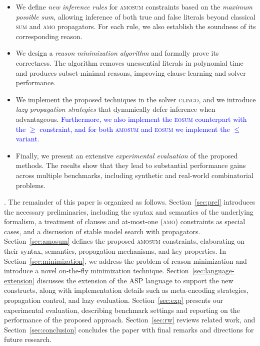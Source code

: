 \documentclass[preprint,authoryear]{elsarticle}
\theoremstyle{definition}
\begin{document}
\begin{itemize}
\item 
We define \emph{new inference rules} for \textsc{amosum} constraints based on the \emph{maximum possible sum}, allowing inference of both true and false literals beyond classical \textsc{sum} and \textsc{amo} propagators. For each rule, we also establish the soundness of its corresponding reason.
\item 
We design a \emph{reason minimization algorithm} and formally prove its correctness. The algorithm removes unessential literals in polynomial time and produces subset-minimal reasons, improving clause learning and solver performance. 
\item 
We implement the proposed techniques in the solver \textsc{clingo}, and we introduce \emph{lazy propagation strategies} that dynamically defer inference when advantageous.
\textcolor{blue}{Furthermore, we also implement the \textsc{eosum} counterpart with the $\ge$ constraint, and for both \textsc{amosum} and \textsc{eosum} we implement the $\le$ variant.}
\item 
Finally, we present an extensive \emph{experimental evaluation} of the proposed methods. The results show that they lead to substantial performance gains across multiple benchmarks, including synthetic and real-world combinatorial problems.
\end{itemize}

. The remainder of this paper is organized as follows. 
Section~\ref{sec:prel} introduces the necessary preliminaries, including the syntax and semantics of the underlying formalism, a treatment of clauses and at-most-one (\textsc{amo}) constraints as special cases, and a discussion of stable model search with propagators.
Section~\ref{sec:amosum} defines the proposed \textsc{amosum} constraints, elaborating on their syntax, semantics, propagation mechanisms, and key properties.
In Section~\ref{sec:minimization}, we address the problem of reason minimization and introduce a novel on-the-fly minimization technique.
Section~\ref{sec:language-extension} discusses the extension of the ASP language to support the new constructs, along with implementation details such as meta-encoding strategies, propagation control, and lazy evaluation. 
Section~\ref{sec:exp} presents our experimental evaluation, describing benchmark settings and reporting on the performance of the proposed approach.
Section~\ref{sec:rw} reviews related work, and Section~\ref{sec:conclusion} concludes the paper with final remarks and directions for future research.
\end{document}

